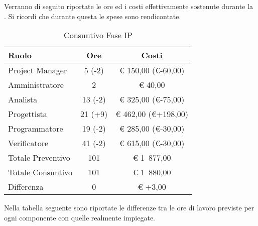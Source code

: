 			Verranno di seguito riportate le ore ed i costi effettivamente sostenute durante la . Si ricordi che durante questa  le spese sono rendicontate.
			\begin{table}[H]
				\begin{center}
					\begin{tabular}{| l | c | c |}
								\hline
								Ruolo 				& Ore 		& Costi  \\ \hline
							
								Project Manager		& 5 (-2)		& \euro{} 150,00 (\euro{}-60,00) 	\\
								Amministratore 		& 2 			& \euro{} 40,00 	\\
								Analista	 		& 13 (-2)		& \euro{} 325,00 (\euro{}-75,00)	\\
								Progettista 		& 21 (+9)		& \euro{} 462,00 (\euro{}+198,00) 	\\
								Programmatore		& 19 (-2)		& \euro{} 285,00 (\euro{}-30,00)	\\
								Verificatore		& 41 (-2)		& \euro{} 615,00 (\euro{}-30,00)	\\ \hline \hline
									
								Totale Preventivo 	& 101 			& \euro{} 1~877,00 	\\ \hline
								Totale Consuntivo	& 101			& \euro{} 1~880,00 	\\ \hline
								Differenza			& 0				& \euro{} +3,00 	\\ \hline
							\end{tabular}
				\end{center}
				\caption{Consuntivo Fase IP}
			\end{table}


			Nella tabella seguente sono riportate le differenze tra le ore di lavoro previste per ogni componente con quelle realmente impiegate.

